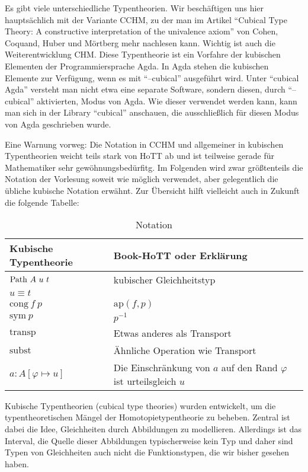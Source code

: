 Es gibt viele unterschiedliche Typentheorien.
Wir beschäftigen uns hier hauptsächlich mit der Variante CCHM, zu der man im Artikel ``Cubical Type Theory: A constructive interpretation of the univalence axiom'' von Cohen, Coquand, Huber und Mörtberg mehr nachlesen kann. Wichtig ist auch die Weiterentwicklung CHM.
Diese Typentheorie ist ein Vorfahre der kubischen Elementen der Programmiersprache Agda.
In Agda stehen die kubischen Elemente zur Verfügung, wenn es mit ``--cubical'' ausgeführt wird.
Unter ``cubical Agda'' versteht man nicht etwa eine separate Software, sondern diesen, durch ``--cubical'' aktivierten, Modus von Agda.
Wie dieser verwendet werden kann, kann man sich in der Library ``cubical'' anschauen, die ausschließlich für diesen Modus von Agda geschrieben wurde.

Eine Warnung vorweg: Die Notation in CCHM und allgemeiner in kubischen Typentheorien weicht teils stark von HoTT ab und ist teilweise gerade für Mathematiker sehr gewöhnungsbedürfitg. Im Folgenden wird zwar größtenteils die Notation der Vorlesung soweit wie möglich verwendet, aber gelegentlich die übliche kubische Notation erwähnt. Zur Übersicht hilft vielleicht auch in Zukunft die folgende Tabelle:

\begin{table}
  \centering
  \begin{tabular}{p{4cm}p{10cm}}
    Kubische Typentheorie         & Book-HoTT oder Erklärung \\
    \hline
    $\Path\ A\ u\ t$              & kubischer Gleichheitstyp \\
    $u\equiv t$                   & \\
    $\mathrm{cong}\ f\ p$         & $\mathrm{ap}(f,p)$ \\
    $\mathrm{sym}\ p$             & $p^{-1}$ \\
    $\mathrm{transp}$             & Etwas anderes als Transport \\
    $\mathrm{subst}$              & Ähnliche Operation wie Transport \\
    $a:A[\varphi\mapsto u]$       & Die Einschränkung von $a$ auf den Rand $\varphi$ ist urteilsgleich $u$
  \end{tabular}
  \caption{Notation}
  \label{tab:notation-ctt}
\end{table}


Kubische Typentheorien (cubical type theories) wurden entwickelt,
um die typentheoretischen Mängel der Homotopietypentheorie zu beheben.
Zentral ist dabei die Idee, Gleichheiten durch Abbildungen zu modellieren.
Allerdings ist das Interval, die Quelle dieser Abbildungen typischerweise kein Typ und daher sind Typen von Gleichheiten auch nicht die Funktionstypen, die wir bisher gesehen haben.

